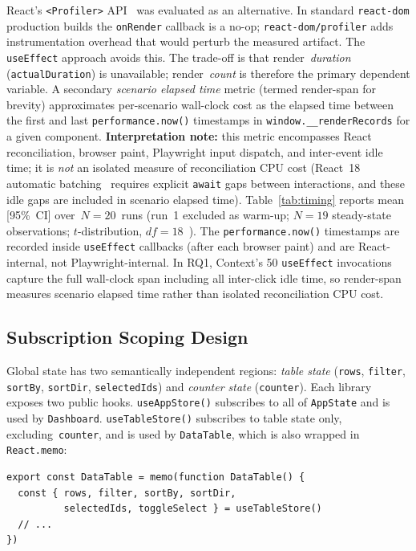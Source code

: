 \documentclass[conference]{IEEEtran}
\newcommand{\code}[1]{\texttt{\small #1}}
\begin{document}
React's \code{<Profiler>} API~\cite{b14} was evaluated as an alternative.
In standard \code{react-dom} production builds the \code{onRender}
callback is a no-op; \code{react-dom/profiler} adds instrumentation
overhead that would perturb the measured artifact. The \code{useEffect}
approach avoids this. The trade-off is that render~\emph{duration}
(\code{actualDuration}) is unavailable; render~\emph{count} is
therefore the primary dependent variable. A secondary
\emph{scenario elapsed time} metric (termed render-span for brevity)
approximates per-scenario wall-clock cost as the elapsed time between
the first and last \code{performance.now()} timestamps in
\lstinline|window.__renderRecords| for a given component.
\textbf{Interpretation note:} this metric encompasses React
reconciliation, browser paint, Playwright input dispatch, and
inter-event idle time; it is \emph{not} an isolated measure of
reconciliation CPU cost (React~18 automatic batching~\cite{b5}
requires explicit \code{await} gaps between interactions, and these
idle gaps are included in scenario elapsed time).
Table~\ref{tab:timing} reports mean [95\%~CI] over~$N{=}20$~runs
(run~1 excluded as warm-up; $N{=}19$ steady-state observations;
$t$-distribution, $df{=}18$~\cite{b10}).  The
\code{performance.now()} timestamps are recorded inside
\code{useEffect} callbacks (after each browser paint) and are
React-internal, not Playwright-internal.  In RQ1, Context's 50
\code{useEffect} invocations capture the full wall-clock span
including all inter-click idle time, so render-span measures scenario
elapsed time rather than isolated reconciliation CPU cost.

\subsection{Subscription Scoping Design}
\label{sec:subscriptions}

Global state has two semantically independent regions: \emph{table
state} (\code{rows}, \code{filter}, \code{sortBy}, \code{sortDir},
\code{selectedIds}) and \emph{counter state} (\code{counter}). Each
library exposes two public hooks. \code{useAppStore()} subscribes to
all of \code{AppState} and is used by \code{Dashboard}.
\code{useTableStore()} subscribes to table state only,
excluding~\code{counter}, and is used by \code{DataTable}, which is
also wrapped in \code{React.memo}:

\begin{lstlisting}
export const DataTable = memo(function DataTable() {
  const { rows, filter, sortBy, sortDir,
          selectedIds, toggleSelect } = useTableStore()
  // ...
})
\end{lstlisting}
\end{document}

